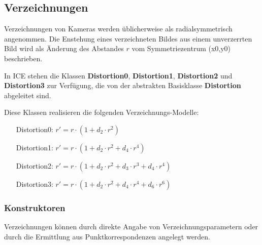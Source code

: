 
\subsection{Verzeichnungen}
\label{Distortion}
\hypertarget{Distortion}{}

Verzeichnungen von Kameras werden üblicherweise als radialsymmetrisch 
angenommen. Die Enstehung eines verzeichneten Bildes aus einem 
unverzerrten Bild wird als Änderung des Abstandes $r$ vom 
Symmetriezentrum (x0,y0) beschrieben. 

In ICE stehen die Klassen {\bf Distortion0}, {\bf Distortion1}, {\bf Distortion2} und 
{\bf Distortion3} zur Verfügung, die von der abstrakten Basisklasse  {\bf
Distortion} abgeleitet sind.

Diese Klassen realisieren die folgenden Verzeichnungs-Modelle:
\begin{itemize}
\item[Distortion0:] $r'=r \cdot (1 + d_2 \cdot r^2)$
\item[Distortion1:] $r'=r \cdot (1 + d_2 \cdot r^2 + d_4 \cdot r^4)$
\item[Distortion2:] $r'=r \cdot (1 + d_2 \cdot r^2 + d_3 \cdot r^3 + d_4 \cdot r^4)$
\item[Distortion3:] $r'=r \cdot (1 + d_2 \cdot r^2 + d_4 \cdot r^4 + d_6 \cdot r^6)$
\end{itemize}

\subsubsection{Konstruktoren}
Verzeichnungen können durch direkte Angabe von Verzeichnungsparametern oder
durch die Ermittlung aus Punktkorrespondenzen angelegt werden. 

